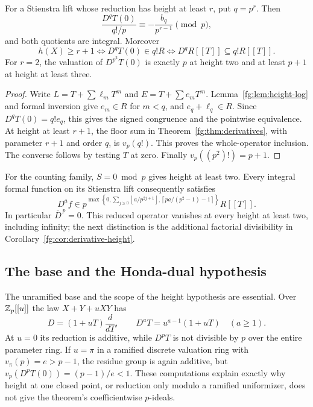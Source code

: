 \begin{corollary}\label{fg:cor:derivative-height}
For a Stienstra lift whose reduction has height at least $r$, put $q=p^r$.
Then
\[
 \frac{D^qT(0)}{q!/p}\equiv
       -\frac{b_q}{p^{r-1}}\pmod p,
\]
and both quotients are integral. Moreover
\[
 h(X)\ge r+1
 \iff D^qT(0)\in q!R
 \iff D^qR[[T]]\subseteq q!R[[T]].
\]
For $r=2$, the valuation of $D^{p^2}T(0)$ is exactly $p$ at height
two and at least $p+1$ at height at least three.
\end{corollary}

\begin{proof}
Write $L=T+\sum\ell_mT^m$ and $E=T+\sum e_mT^m$.
Lemma~\ref{fg:lem:height-log} and formal inversion give
$e_m\in R$ for $m<q$, and $e_q+\ell_q\in R$. Since
$D^qT(0)=q!e_q$, this gives the signed congruence and the pointwise
equivalence. At height at least $r+1$, the floor sum in
Theorem~\ref{fg:thm:derivatives}, with parameter $r+1$ and order $q$,
is $v_p(q!)$. This proves the whole-operator inclusion. The converse
follows by testing $T$ at zero. Finally $v_p((p^2)!)=p+1$.
\end{proof}

For the counting family, $S=0\bmod p$ gives height at least two.
Every integral formal function on its Stienstra lift consequently
satisfies
\[
 D^af\in p^{\max\left\{0,
    \sum_{j\ge0}\left\lfloor a/p^{2j+1}\right\rfloor,
    \left\lceil pa/(p^2-1)-1\right\rceil\right\}}R[[T]].
\]
In particular $\overline D^{\,p}=0$. This reduced operator vanishes
at every height at least two, including infinity; the next distinction
is the additional factorial divisibility in
Corollary~\ref{fg:cor:derivative-height}.

\subsection{The base and the Honda-dual hypothesis}
The unramified base and the scope of the height hypothesis are essential.
Over $\mathbb Z_p[[u]]$ the law $X+Y+uXY$ has
\[
 D=(1+uT)\frac d{dT},\qquad D^aT=u^{a-1}(1+uT)\quad(a\ge1).
\]
At $u=0$ its reduction is additive, while $D^pT$ is not divisible by
$p$ over the entire parameter ring. If $u=\pi$ in a ramified discrete
valuation ring with $v_\pi(p)=e>p-1$, the residue group is again additive,
but $v_p(D^pT(0))=(p-1)/e<1$. These computations explain exactly why
height at one closed point, or reduction only modulo a ramified
uniformizer, does not give the theorem's coefficientwise $p$-ideals.


